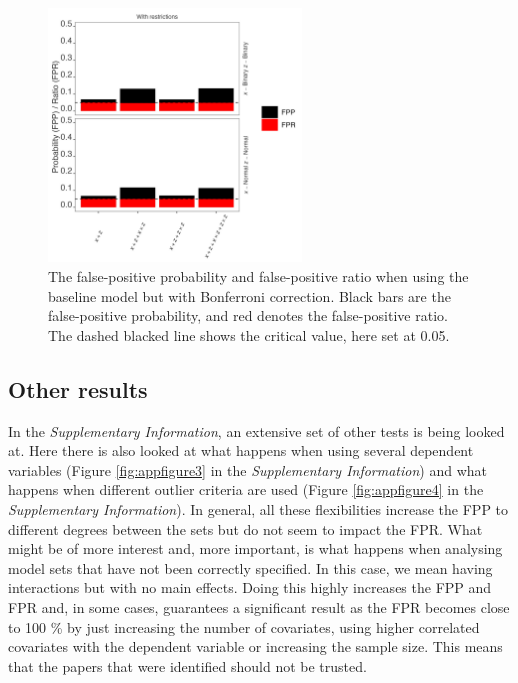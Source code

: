 \begin{figure}[hbt!]
\includegraphics[width=0.6\textwidth]{R/Analysis/Result/Figures/Figure1ABon_with.jpeg}
\centering
\caption{The false-positive probability and false-positive ratio when using the baseline model but with Bonferroni correction. Black bars are the false-positive probability, and red denotes the false-positive ratio. The dashed blacked line shows the critical value, here set at 0.05.}
\label{fig:mainfigure1_bon}
\end{figure}

\subsection{Other results}
In the \textit{Supplementary Information}, an extensive set of other tests is being looked at. Here there is also looked at what happens when using several dependent variables (Figure \ref{fig:appfigure3} in the \textit{Supplementary Information}) and what happens when different outlier criteria are used (Figure \ref{fig:appfigure4} in the \textit{Supplementary Information}). In general, all these flexibilities increase the FPP to different degrees between the sets but do not seem to impact the FPR. What might be of more interest and, more important, is what happens when analysing model sets that have not been correctly specified. In this case, we mean having interactions but with no main effects. Doing this highly increases the FPP and FPR and, in some cases, guarantees a significant result as the FPR becomes close to 100 \% by just increasing the number of covariates, using higher correlated covariates with the dependent variable or increasing the sample size. This means that the papers that were identified should not be trusted.
